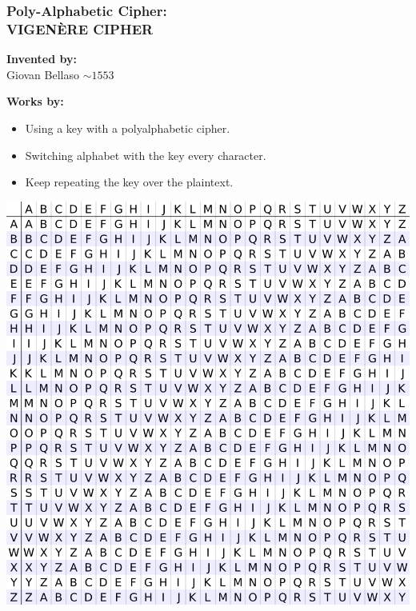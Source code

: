 \documentclass{uva-inf-presentation}
\begin{document}
\begin{frame}
\frametitle{Poly-Alphabetic Cipher:\\ VIGENÈRE CIPHER}
\begin{minipage}{0.55\linewidth}
\textbf{Invented by:}\\
Giovan Bellaso $\sim 1553$

\textbf{Works by:}
\begin{itemize}
\item Using a key with a polyalphabetic cipher.
\item Switching alphabet with the key every character.
\item Keep repeating the key over the plaintext.
\end{itemize}
\end{minipage}%
\begin{minipage}{0.45\linewidth}
\centering
\includegraphics[width=0.95\linewidth]{Vigenere_square_shading} %
\end{minipage}
\end{frame}
\end{document}
